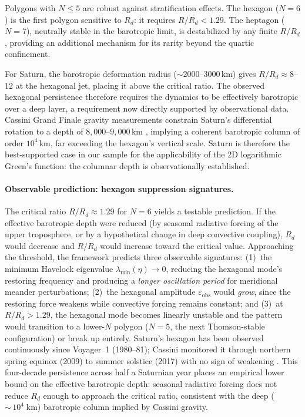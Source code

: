 \noindent
Polygons with $N \le 5$ are robust against stratification effects.
The hexagon ($N = 6$) is the first polygon sensitive to $R_d$: it
requires $R/R_d < 1.29$.  The heptagon ($N = 7$), neutrally stable
in the barotropic limit, is destabilized by any finite
$R/R_d$, providing an additional mechanism for its rarity beyond the
quartic confinement.

For Saturn, the barotropic deformation radius
($\sim\!2000$--$3000\,$km) gives $R/R_d \approx 8$--$12$ at the
hexagonal jet, placing it above the critical ratio.  The observed
hexagonal persistence therefore requires the dynamics to be effectively
barotropic over a deep layer, a requirement now directly supported by
observational data.  Cassini Grand Finale gravity measurements constrain
Saturn's differential rotation to a depth of $8{,}000$--$9{,}000$\,km
\citep{Iess2019}, implying a coherent barotropic column of order
$10^4$\,km, far exceeding the hexagon's vertical scale.  Saturn is
therefore the best-supported case in our sample for the applicability
of the 2D logarithmic Green's function: the columnar depth is
observationally established.

\paragraph{Observable prediction: hexagon suppression signatures.}
The critical ratio $R/R_d \approx 1.29$ for $N = 6$ yields a
testable prediction.  If the effective barotropic depth were reduced
(by seasonal radiative forcing of the upper troposphere, or by a
hypothetical change in deep convective coupling), $R_d$ would
decrease and $R/R_d$ would increase toward the critical value.
Approaching the threshold, the framework predicts three observable
signatures: (1)~the minimum Havelock eigenvalue
$\lambda_{\min}(\eta) \to 0$, reducing the hexagonal mode's
restoring frequency and producing a \emph{longer oscillation period}
for meridional meander perturbations;
(2)~the hexagonal amplitude $\varepsilon_{\mathrm{obs}}$ would
\emph{grow}, since the restoring force weakens while convective
forcing remains constant; and
(3)~at $R/R_d > 1.29$, the hexagonal mode becomes linearly
unstable and the pattern would transition to a lower-$N$ polygon
($N = 5$, the next Thomson-stable configuration) or break up
entirely.
Saturn's hexagon has been observed continuously since Voyager~1
(1980--81); Cassini monitored it through northern spring equinox
(2009) to summer solstice (2017) with no sign of weakening
\citep{Antunano2015, SanchezLavega2014}.  This four-decade
persistence across half a Saturnian year places an empirical lower
bound on the effective barotropic depth: seasonal radiative forcing
does not reduce $R_d$ enough to approach the critical ratio, consistent
with the deep (${\sim}\,10^4\;\mathrm{km}$) barotropic column
implied by Cassini gravity.


